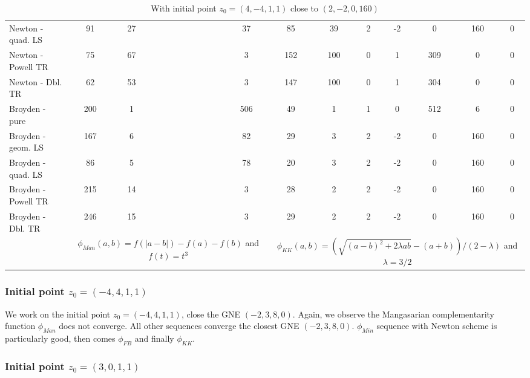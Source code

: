 \documentclass[11pt, a4paper]{article}
\begin{document}
\begin{table}[htb!]
\begin{scriptsize}
\begin{tabular}{l|ccccccc|ccccccc}
Newton - quad. LS  &   91  &  27  &    &    &    &    &  37  &  85  &  39  &  2  &  -2  &  0  &  160  &  0 \\ 
Newton - Powell TR  &   75  &  67  &    &    &    &    &  3  &  152  &  100  &  0  &  1  &  309  &  0  &  0 \\ 
Newton - Dbl. TR  &   62  &  53  &    &    &    &    &  3  &  147  &  100  &  0  &  1  &  304  &  0  &  0 \\ 
Broyden - pure  &   200  &  1  &    &    &    &    &  506  &  49  &  1  &  1  &  0  &  512  &  6  &  0 \\ 
Broyden - geom. LS  &   167  &  6  &    &    &    &    &  82  &  29  &  3  &  2  &  -2  &  0  &  160  &  0 \\ 
Broyden - quad. LS  &   86  &  5  &    &    &    &    &  78  &  20  &  3  &  2  &  -2  &  0  &  160  &  0 \\ 
Broyden - Powell TR  &   215  &  14  &    &    &    &    &  3  &  28  &  2  &  2  &  -2  &  0  &  160  &  0 \\ 
Broyden - Dbl. TR  &   246  &  15  &    &    &    &    &  3  &  29  &  2  &  2  &  -2  &  0  &  160  &  0 \\ 
\hline
& \multicolumn{7}{c|}{$\phi_{Man}(a,b)=f(|a-b|) - f(a) - f(b)$ and $f(t)=t^3$} & 
\multicolumn{7}{c}{$\phi_{KK}(a,b)= (\sqrt{(a-b)^2+2\lambda a b} -(a+b))/(2-\lambda)$ and $\lambda=3/2$} \\
\end{tabular}
\end{scriptsize}

\caption{With initial point $z_0 = (4, -4,  1,  1)$ close to $(2, -2, 0, 160)$}
\label{bench4m411}

\end{table}


\subsubsection{Initial point $z_0 = (-4, 4,  1,  1)$}

We work on the initial point $z_0 = (-4, 4,  1,  1)$, close the GNE  $(-2, 3, 8, 0)$.
Again, we observe the Mangasarian complementarity function $\phi_{Man}$ does not converge. All other sequences converge the closest GNE $(-2, 3, 8, 0)$. $\phi_{Min}$ sequence with Newton scheme is particularly good, then comes $\phi_{FB}$ and finally $\phi_{KK}$.





\subsubsection{Initial point $z_0 = (3, 0,  1,  1)$}
\end{document}
